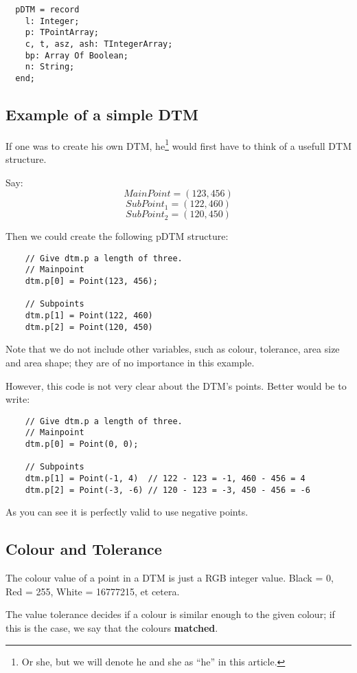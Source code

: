 \documentclass[a4paper, 10pt]{report} %
\begin{document}
\begin{verbatim}
  pDTM = record
    l: Integer;
    p: TPointArray;
    c, t, asz, ash: TIntegerArray;
    bp: Array Of Boolean;
    n: String;
  end;                                           
\end{verbatim}

\subsection{Example of a simple DTM}
If one was to create his own DTM, he\footnote{Or she, but we will denote he
and she as ``he'' in this article.} would first have to think of a usefull DTM
structure.

Say:
$$ MainPoint = (123, 456)  $$
$$ SubPoint_1 = (122, 460) $$
$$ SubPoint_2 = (120, 450) $$

Then we could create the following pDTM structure:

\begin{verbatim}
	// Give dtm.p a length of three.
	// Mainpoint
	dtm.p[0] = Point(123, 456);

	// Subpoints
	dtm.p[1] = Point(122, 460)
	dtm.p[2] = Point(120, 450)
\end{verbatim}

Note that we do not include other variables, such as colour, tolerance, area
size and area shape; they are of no importance in this example.

However, this code is not very clear about the DTM's points.
Better would be to write:

\begin{verbatim}
    // Give dtm.p a length of three.
    // Mainpoint
    dtm.p[0] = Point(0, 0);

    // Subpoints
    dtm.p[1] = Point(-1, 4)  // 122 - 123 = -1, 460 - 456 = 4
    dtm.p[2] = Point(-3, -6) // 120 - 123 = -3, 450 - 456 = -6
\end{verbatim}

As you can see it is perfectly valid to use negative points.

\subsection{Colour and Tolerance}

The colour value of a point in a DTM is just a RGB integer value.
Black = 0, Red = 255, White = 16777215, et cetera.

The value tolerance decides if a colour is similar enough to the given
colour; if this is the case, we say that the colours \textbf{matched}.
\end{document}

